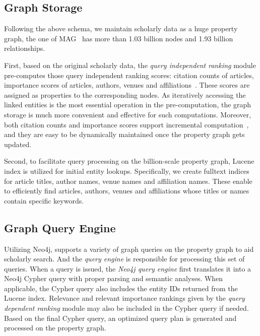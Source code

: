 \subsection{Graph Storage} \label{subsec:storage}


Following the above schema, we maintain scholarly data as a huge property graph, \eg the one of MAG~\cite{sinha2015overview}  has more than 1.03 billion nodes and 1.93 billion relationships. %


First, based on the original scholarly data, the {\em query independent ranking} module pre-computes those query independent ranking scores: citation counts of articles, importance scores of articles, authors, venues and affiliations~\cite{ma2018query}. These scores are assigned as properties to the corresponding nodes.
As iteratively accessing the linked entities is the most essential operation in the pre-computation, the graph storage is much more convenient and effective for such computations.
Moreover, both citation counts and importance scores support incremental computation~\cite{ma2018query}, and they are easy to be dynamically maintained once the property graph gets updated.


Second, to facilitate query processing on the billion-scale property graph, Lucene index is utilized for initial entity lookups. Specifically, we create fulltext indices for article titles, author names, venue names and affiliation names. These enable to efficiently find articles, authors, venues and affiliations whose titles or names contain specific keywords. %




\subsection{Graph Query Engine} \label{subsec:qe}
Utilizing Neo4j, \oursystem supports a variety of graph queries on the property graph to aid scholarly search. And the {\em query engine} is responsible for processing this set of queries. When a query is issued, the {\em Neo4j query engine} first translates it into a  Neo4j Cypher query with proper parsing and semantic analyses. When applicable, the Cypher query also includes the entity IDs returned from the Lucene index. Relevance and relevant importance rankings given by the {\em query dependent ranking} module may also be included in the Cypher query if needed. Based on the final Cypher query, an optimized query plan is generated and processed on the property graph.

